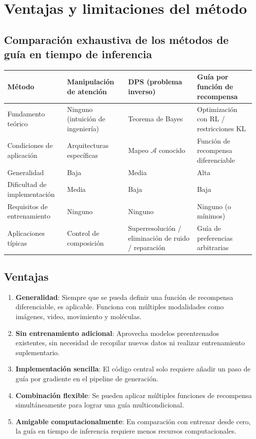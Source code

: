 \section{Ventajas y limitaciones del método}

\subsection{Comparación exhaustiva de los métodos de guía en tiempo de inferencia}

\begin{center}
\begin{tabular}{p{3cm}p{3.5cm}p{3.5cm}p{3.5cm}}
\toprule
\textbf{Método} & \textbf{Manipulación de atención} & \textbf{DPS (problema inverso)} & \textbf{Guía por función de recompensa} \\
\midrule
Fundamento teórico & Ninguno (intuición de ingeniería) & Teorema de Bayes & Optimización con RL / restricciones KL \\
Condiciones de aplicación & Arquitecturas específicas & Mapeo $\mathcal{A}$ conocido & Función de recompensa diferenciable \\
Generalidad & Baja & Media & Alta \\
Dificultad de implementación & Media & Baja & Baja \\
Requisitos de entrenamiento & Ninguno & Ninguno & Ninguno (o mínimos) \\
Aplicaciones típicas & Control de composición & Superresolución / eliminación de ruido / reparación & Guía de preferencias arbitrarias \\
\bottomrule
\end{tabular}
\end{center}

\subsection{Ventajas}

\begin{enumerate}
    \item \textbf{Generalidad}: Siempre que se pueda definir una función de recompensa diferenciable, es aplicable. Funciona con múltiples modalidades como imágenes, video, movimiento y moléculas.
    \item \textbf{Sin entrenamiento adicional}: Aprovecha modelos preentrenados existentes, sin necesidad de recopilar nuevos datos ni realizar entrenamiento suplementario.
    \item \textbf{Implementación sencilla}: El código central solo requiere añadir un paso de guía por gradiente en el pipeline de generación.
    \item \textbf{Combinación flexible}: Se pueden aplicar múltiples funciones de recompensa simultáneamente para lograr una guía multicondicional.
    \item \textbf{Amigable computacionalmente}: En comparación con entrenar desde cero, la guía en tiempo de inferencia requiere menos recursos computacionales.
\end{enumerate}

